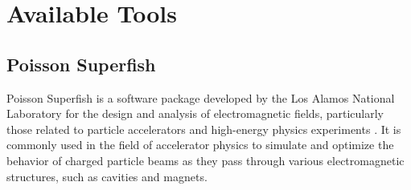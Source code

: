 \documentclass[a4paper,oneside,12pt]{report}
\numberwithin{equation}{chapter}
\begin{document}


\tableofcontents


\newcommand{\vecthreeBF}[1]{\vec{\textbf{#1}}}
\newcommand{\vecthree}[1]{\vec{#1}}

\newcommand{\parDeriv}[2]{\frac{\partial #1}{\partial #2}}
\newcommand{\parDerivS}[2]{\frac{\partial^2 #1}{\partial #2^2}}
\newcommand{\derivS}[2]{\frac{d^2 #1}{d#2^2}}

\newcommand{\dotProdBF}[2]{\vecthreeBF{#1} \cdot \vecthreeBF{#2}}
\newcommand{\dotProd}[2]{\vecthree{#1} \cdot \vecthree{#2}}

\newcommand{\crossProdBF}[2]{\vecthreeBF{#1} \times \vecthreeBF{#2}}
\newcommand{\crossProd}[2]{\vecthree{#1} \times \vecthree{#2}}


\newcommand{\fromeq}[1]{\textit{equation \ref{eq:#1}}}
\newcommand{\fromeqs}[2]{\textit{equations \ref{eq:#1} and \ref{eq:#2}}}
\newcommand{\fromeqsth}[3]{\textit{equations \ref{eq:#1}, \ref{eq:#2} and \ref{eq:#3}}}

\newcommand{\fromfig}[1]{\textit{figure \ref{fig:#1}}}
\newcommand{\fromfigs}[2]{\textit{figures \ref{fig:#1} and \ref{fig:#2}}}

\newcommand{\fromsec}[1]{\textit{section \ref{sec:#1}}}
\newcommand{\fromsecs}[2]{\textit{sections \ref{sec:#1} and \ref{sec:#2}}}

\newcommand{\e}{$\textbf{e}^-$ }
\newcommand{\egun}{$\textbf{e}^-$-gun }
\newcommand{\eB}{$\textbf{e}^-$ - $\vecthreeBF{B}$ }
\newcommand{\eE}{$\textbf{e}^-$ - $\vecthreeBF{E}$ }
\newcommand{\eEM}{$\textbf{e}^-$ - \textbf{EM} }
\newcommand{\ee}{$\textbf{e}^-$ - $\textbf{e}^-$ }


\section{Available Tools}

\subsection{Poisson Superfish}
Poisson Superfish is a software package developed by the Los Alamos National Laboratory 
for the design and analysis of electromagnetic fields, particularly those related to particle accelerators and high-energy physics experiments \cite{poi-sup}.
It is commonly used in the field of accelerator physics to simulate and optimize the behavior of charged particle beams as they pass through various electromagnetic structures, such as cavities and magnets.
\end{document}
